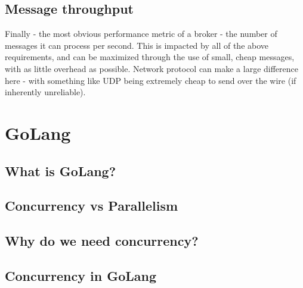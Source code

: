\subsection{Message throughput}
\label{sub:Message throughput}

Finally - the most obvious performance metric of a broker - the number of
messages it can process per second. This is impacted by all of the above
requirements, and can be maximized through the use of small, cheap messages,
with as little overhead as possible. Network protocol can make a large
difference here - with something like UDP being extremely cheap to send over the
wire (if inherently unreliable).

\section{GoLang}
\label{sec:GoLang}


\subsection{What is GoLang?}
\label{sub:What is GoLang?}


\subsection{Concurrency vs Parallelism}
\label{sub:concurrencyparallelism}


\subsection{Why do we need concurrency?}
\label{sub:Why do we need parallism}


\subsection{Concurrency in GoLang}
\label{sub:Concurrency in GoLang}


